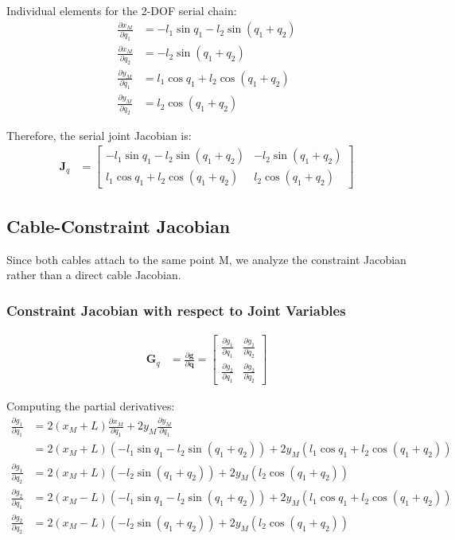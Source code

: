 \documentclass[11pt,a4paper]{article}
\begin{document}
Individual elements for the 2-DOF serial chain:
\begin{align}
\frac{\partial x_M}{\partial q_1} &= -l_1 \sin q_1 - l_2 \sin(q_1 + q_2) \\
\frac{\partial x_M}{\partial q_2} &= -l_2 \sin(q_1 + q_2) \\
\frac{\partial y_M}{\partial q_1} &= l_1 \cos q_1 + l_2 \cos(q_1 + q_2) \\
\frac{\partial y_M}{\partial q_2} &= l_2 \cos(q_1 + q_2)
\end{align}

Therefore, the serial joint Jacobian is:
\begin{align}
\bm{J}_q &= \begin{bmatrix}
-l_1 \sin q_1 - l_2 \sin(q_1 + q_2) & -l_2 \sin(q_1 + q_2) \\
l_1 \cos q_1 + l_2 \cos(q_1 + q_2) & l_2 \cos(q_1 + q_2)
\end{bmatrix}
\end{align}

\subsection{Cable-Constraint Jacobian}
Since both cables attach to the same point M, we analyze the constraint Jacobian rather than a direct cable Jacobian. 

\subsubsection{Constraint Jacobian with respect to Joint Variables}
\begin{align}
\bm{G}_q &= \frac{\partial \bm{g}}{\partial \bm{q}} = \begin{bmatrix}
\frac{\partial g_1}{\partial q_1} & \frac{\partial g_1}{\partial q_2} \\
\frac{\partial g_2}{\partial q_1} & \frac{\partial g_2}{\partial q_2}
\end{bmatrix}
\end{align}

Computing the partial derivatives:
\begin{align}
\frac{\partial g_1}{\partial q_1} &= 2(x_M + L)\frac{\partial x_M}{\partial q_1} + 2y_M\frac{\partial y_M}{\partial q_1} \\
&= 2(x_M + L)(-l_1 \sin q_1 - l_2 \sin(q_1 + q_2)) + 2y_M(l_1 \cos q_1 + l_2 \cos(q_1 + q_2)) \\
\frac{\partial g_1}{\partial q_2} &= 2(x_M + L)(-l_2 \sin(q_1 + q_2)) + 2y_M(l_2 \cos(q_1 + q_2)) \\
\frac{\partial g_2}{\partial q_1} &= 2(x_M - L)(-l_1 \sin q_1 - l_2 \sin(q_1 + q_2)) + 2y_M(l_1 \cos q_1 + l_2 \cos(q_1 + q_2)) \\
\frac{\partial g_2}{\partial q_2} &= 2(x_M - L)(-l_2 \sin(q_1 + q_2)) + 2y_M(l_2 \cos(q_1 + q_2))
\end{align}
\end{document}
